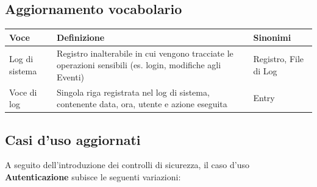 \documentclass[12pt,a4paper]{report}
\begin{document}
\subsection{Aggiornamento vocabolario}
\begin{tabularx}{\textwidth}{|p{2.8cm}|X|p{2.2cm}|}
    \hline
    \rowcolor{studyColor} \textbf{Voce} & \textbf{Definizione} & \textbf{Sinonimi} \\ \hline
    \endhead
    Log di sistema & Registro inalterabile in cui vengono tracciate le operazioni sensibili (es. login, modifiche agli Eventi) & Registro, File di Log \\ \hline
    Voce di log & Singola riga registrata nel log di sistema, contenente data, ora, utente e azione eseguita & Entry \\ \hline
\end{tabularx}

\subsection{Casi d'uso aggiornati}
A seguito dell'introduzione dei controlli di sicurezza, il caso d'uso \textbf{Autenticazione} subisce le seguenti variazioni:
\end{document}
